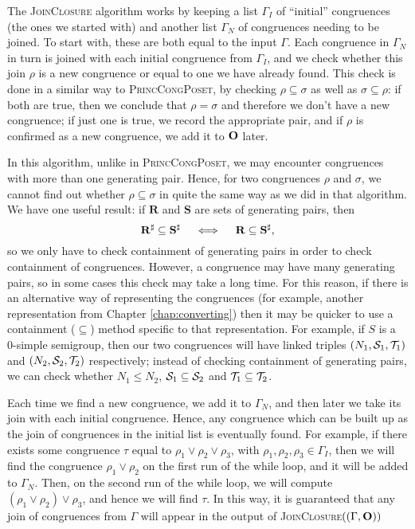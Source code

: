 The \textsc{JoinClosure} algorithm works by keeping a list $\Gamma_I$ of
``initial'' congruences (the ones we started with) and another list $\Gamma_N$
of congruences needing to be joined.  To start with, these are both equal to the
input $\Gamma$.  Each congruence in $\Gamma_N$ in turn is joined with each
initial congruence from $\Gamma_I$, and we check whether this join $\rho$ is a
new congruence or equal to one we have already found.  This check is done in a
similar way to \textsc{PrincCongPoset}, by checking $\rho \subseteq \sigma$ as
well as $\sigma \subseteq \rho$: if both are true, then we conclude that
$\rho = \sigma$ and therefore we don't have a new congruence; if just one is
true, we record the appropriate pair, and if $\rho$ is confirmed as a new
congruence, we add it to $\mathbf{O}$ later.

In this algorithm, unlike in \textsc{PrincCongPoset}, we may encounter
congruences with more than one generating pair.  Hence, for two congruences
$\rho$ and $\sigma$, we cannot find out whether $\rho \subseteq \sigma$ in quite
the same way as we did in that algorithm.  We have one useful result: if
$\mathbf{R}$ and $\mathbf{S}$ are sets of generating pairs, then
$$\mathbf{R}^\sharp \subseteq \mathbf{S}^\sharp \quad\iff\quad
\mathbf{R} \subseteq \mathbf{S}^\sharp,$$
so we only have to check containment of generating pairs in order to check
containment of congruences.  However, a congruence may have many generating
pairs, so in some cases this check may take a long time.  For this reason, if
there is an alternative way of representing the congruences (for example,
another representation from Chapter \ref{chap:converting}) then it may be
quicker to use a containment ($\subseteq$) method specific to that
representation.  For example, if $S$ is a 0-simple semigroup, then our two
congruences will have linked triples $(N_1,\mathcal{S}_1,\mathcal{T}_1)$ and $(N_2,\mathcal{S}_2,\mathcal{T}_2)$
respectively; instead of checking containment of generating pairs, we can check
whether $N_1 \leq N_2$, $\mathcal{S}_1 \subseteq \mathcal{S}_2$ and $\mathcal{T}_1 \subseteq \mathcal{T}_2$.

Each time we find a new congruence, we add it to $\Gamma_N$, and then later we
take its join with each initial congruence.  Hence, any congruence which can be
built up as the join of congruences in the initial list is eventually found.
For example, if there exists some congruence $\tau$ equal to
$\rho_1 \vee \rho_2 \vee \rho_3$, with $\rho_1,\rho_2,\rho_3 \in \Gamma_I$, then
we will find the congruence $\rho_1 \vee \rho_2$ on the first run of the while
loop, and it will be added to $\Gamma_N$.  Then, on the second run of the while
loop, we will compute $(\rho_1 \vee \rho_2) \vee \rho_3$, and hence we will find
$\tau$.  In this way, it is guaranteed that any join of congruences from
$\Gamma$ will appear in the output of
\textsc{JoinClosure}$((\Gamma, \mathbf{O}))$

